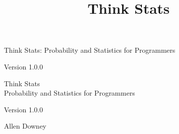 \documentclass[10pt]{book}
\title{Think Stats}
\newcommand{\theversion}{1.0.0}
\begin{document}
\frontmatter




\newtheorem{ex}{Exercise}[chapter]

\begin{latexonly}

\renewcommand{\blankpage}{\thispagestyle{empty} \quad \newpage}



\thispagestyle{empty}

\begin{flushright}
\vspace*{2.0in}

\begin{spacing}{3}
{\huge Think Stats: Probability and Statistics for Programmers}\\
{\Large }
\end{spacing}

\vspace{0.25in}

Version \theversion

\vfill

\end{flushright}


\blankpage
\blankpage

\pagebreak
\thispagestyle{empty}

\begin{flushright}
\vspace*{2.0in}

\begin{spacing}{3}
{\huge Think Stats}\\
{\Large Probability and Statistics for Programmers}
\end{spacing}

\vspace{0.25in}

Version \theversion

\vspace{1in}


{\Large
Allen Downey\\
}



\end{flushright}
\end{latexonly}
\end{document}
